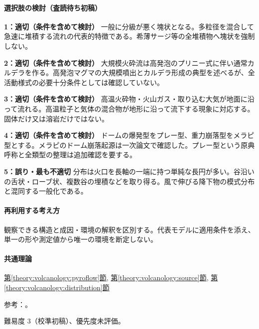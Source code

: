\paragraph{選択肢の検討（査読待ち初稿）}\mbox{}\par

\noindent\textbf{1：適切（条件を含めて検討）} 一般に分級が悪く塊状となる。多粒径を混合して急速に堆積する流れの代表的特徴である。希薄サージ等の全堆積物へ塊状を強制しない。\par

\noindent\textbf{2：適切（条件を含めて検討）} 大規模火砕流は高発泡のプリニー式に伴い通常カルデラを作る。高発泡マグマの大規模噴出とカルデラ形成の典型を述べるが、全活動様式の必要十分条件としては確認していない。\par

\noindent\textbf{3：適切（条件を含めて検討）} 高温火砕物・火山ガス・取り込む大気が地面に沿って流れる。高温粒子と気体の混合物が地形に沿って流下する現象に対応する。固体だけ又は溶岩だけではない。\par

\noindent\textbf{4：適切（条件を含めて検討）} ドームの爆発型をプレー型、重力崩落型をメラピ型とする。メラピのドーム崩落起源は一次論文で確認した。プレー型という原典呼称と全類型の整理は追加確認を要する。\par

\noindent\textbf{5：誤り・最も不適切} 分布は火口を長軸の一端に持つ単純な長円が多い。谷沿いの舌状・ローブ状、複数谷の埋積などを取り得る。風で伸びる降下物の模式分布と混同する一般化である。\par

\paragraph{再利用する考え方} 観察できる構造と成因・環境の解釈を区別する。代表モデルに適用条件を添え、単一の形や測定値から唯一の環境を断定しない。

\paragraph{共通理論} \hyperref[theory:volcanology:pyroflow]{第\ref*{theory:volcanology:pyroflow}節}, \hyperref[theory:volcanology:source]{第\ref*{theory:volcanology:source}節}, \hyperref[theory:volcanology:distribution]{第\ref*{theory:volcanology:distribution}節}

\par 参考：\cite{volc_usgs_merapi,volc_usgs_msh_flow}。

\par 難易度 3（校準初稿）、優先度未評価。
